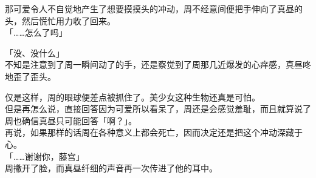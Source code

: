 那可爱令人不自觉地产生了想要摸摸头的冲动，周不经意间便把手伸向了真昼的头，然后慌忙用力收了回来。\\

「……怎么了吗」

「没、没什么」\\

不知是注意到了周一瞬间动了的手，还是察觉到了周那几近爆发的心痒感，真昼咚地歪了歪头。

仅是这样，周的眼球便差点被抓住了。美少女这种生物还真是可怕。\\

但是再怎么说，直接回答因为可爱所以看呆了，周还是会感觉羞耻，而且就算说了周也确信真昼只可能回答「啊？」。\\

再说，如果那样的话周在各种意义上都会死亡，因而决定还是把这个冲动深藏于心。\\

「……谢谢你，藤宫」\\

周撇开了脸，而真昼纤细的声音再一次传进了他的耳中。

